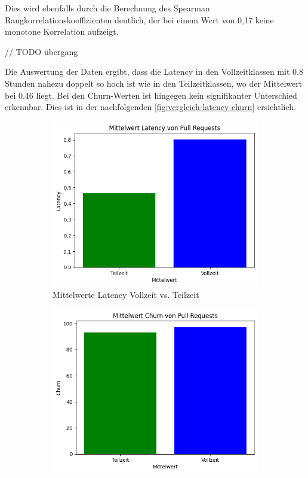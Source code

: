 Dies wird ebenfalls durch die Berechnung des Spearman Rangkorrelationskoeffizienten deutlich, der bei einem Wert von 0,17 keine monotone Korrelation aufzeigt.

// TODO übergang

Die Auswertung der Daten ergibt, dass die Latency in den Vollzeitklassen mit 0.8 Stunden nahezu doppelt so hoch ist wie in den Teilzeitklassen, wo der Mittelwert bei 0.46 liegt. Bei den Churn-Werten ist hingegen kein signifikanter Unterschied erkennbar. Dies ist in der nachfolgenden \autoref{fig:vergleich-latency-churn} ersichtlich.

\begin{figure}[ht]
    \centering
    \begin{subfigure}[b]{0.48\textwidth}
        \centering
        \includegraphics[width=\textwidth]{Figures/mittelwert-latency-t-v.png}
        \caption{Mittelwerte Latency Vollzeit vs. Teilzeit}
        \label{fig:mittelwert-latency-t-v}
    \end{subfigure}
    \hfill
    \begin{subfigure}[b]{0.48\textwidth}
        \centering
        \includegraphics[width=\textwidth]{Figures/mittelwert-churn-t-v.png}

\end{subfigure}
\end{figure}
